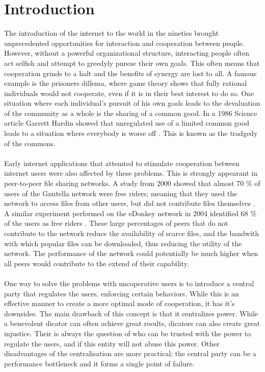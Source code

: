\chapter{Introduction}
\label{chp:introduction}
\vspace{1\baselineskip}

\noindent
The introduction of the internet to the world in the nineties brought unprecedented opportunities for interaction and cooperation between people. However, without a powerful organizational structure, interacting people often act selfish and attempt to greedyly pursue their own goals. This often means that cooperation grinds to a halt and the benefits of synergy are lost to all. A famous example is the prisoners dillema, where game theory shows that fully rational individuals would not cooperate, even if it is in their best interest to do so. One situation where each individual's pursuit of his own goals leads to the devaluation of the community as a whole is the sharing of a common good. In a 1986 Science article Garrett Hardin showed that unregulated use of a limited common good leads to a situation where everybody is worse off \cite{hardin1968tragedy}. This is known as the tradgedy of the commons.\\
\\
Early internet applications that attemted to stimulate cooperation between internet users were also affected by these problems. This is strongly appearant in peer-to-peer file sharing networks. A study from 2000 showed that almost 70 \% of users of the Gnutella network were free riders; meaning that they used the network to access files from other users, but did not contribute files themselves \cite{adar2000free}. A similar experiment performed on the eDonkey network in 2004 identified 68 \% of the users as free riders \cite{edonkey2004}. These large percentages of peers that do not contribute to the network reduce the availability of scarce files, and the bandwith with which popular files can be downloaded, thus reducing the utility of the network. The performance of the network could potentially be much higher when all peers would contribute to the extend of their capability.\\
\\
One way to solve the problems with uncoperative users is to introduce a central party that regulates the users, enforcing certain behaviors. While this is an effective manner to create a more optimal mode of cooperation, it has it's downsides. The main drawback of this concept is that it centralizes power. While a benevolent dicator can often achieve great results, dicators can also create great injustice. Their is always the question of who can be trusted with the power to regulate the users, and if this entity will not abuse this power. Other disadvantages of the centralisation are more practical; the central party can be a performance bottleneck and it forms a single point of failure. \\
